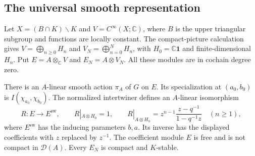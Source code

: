 \subsection{The universal smooth representation}

Let $X=(B\cap K)\backslash K$ and $V=C^\infty(X;\mathbb C)$,
where $B$ is the upper triangular subgroup and functions are locally constant.
The compact-picture calculation gives
$V=\bigoplus_{n\ge0}H_n$ and $V_N=\bigoplus_{n=0}^NH_n$,
with $H_0=\mathbb C\mathbf1$ and finite-dimensional $H_n$.
Put $E=A\otimes_{\mathbb C}V$ and $E_N=A\otimes V_N$.
All these modules are in cochain degree zero.

\begin{proposition}
\label{v4-arith:eis:parameter-induction}
There is an $A$-linear smooth action $\pi_A$ of $G$ on $E$.
Its specialization at $(a_0,b_0)$ is $I(\chi_{a_0},\chi_{b_0})$.
The normalized intertwiner defines an $A$-linear isomorphism
\[
 R:E\longrightarrow E^{\mathrm{sw}},\qquad
 R|_{A\otimes H_0}=1,\qquad
 R|_{A\otimes H_n}=z^{n-1}\frac{z-q^{-1}}{1-q^{-1}z}\quad(n\ge1),
\]
where $E^{\mathrm{sw}}$ has the inducing parameters $b,a$.
Its inverse has the displayed coefficients with $z$ replaced by $z^{-1}$.
The coefficient module $E$ is free and is not compact in $\mathcal D(A)$.
Every $E_N$ is compact and $K$-stable.
\end{proposition}

